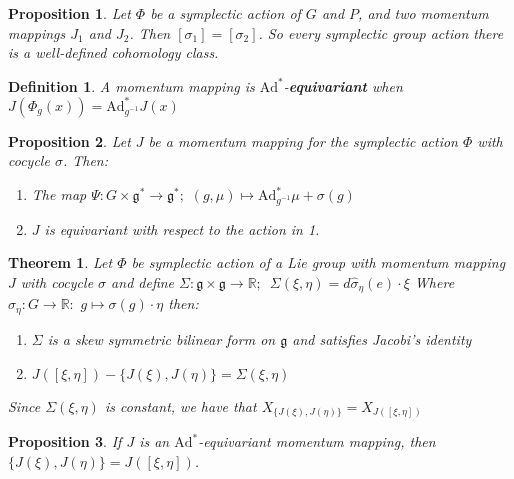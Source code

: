 \documentclass{article}
\newtheorem{thm}{Theorem}
\newtheorem{defn}{Definition}
\newtheorem{prop}{Proposition}
\begin{document}
\begin{prop}

Let $\Phi$ be a symplectic action of $G$ and $P$, and two momentum mappings $J_1$ and $J_2$. Then $[\sigma_1] = [\sigma_2]$. So every symplectic group action there is a well-defined cohomology class.
\end{prop}

\begin{defn}

A momentum mapping is $\mathrm{Ad}^*$-\textbf{equivariant} when $J(\Phi_g(x)) = \mathrm{Ad}^*_{g^{-1}} J(x)$

\end{defn}

\begin{prop}

Let $J$ be a momentum mapping for the symplectic action $\Phi$ with cocycle $\sigma$. Then: 
\begin{enumerate}
    \item The map $\Psi: G \times \mathfrak{g}^* \to \mathfrak{g}^*; \hspace{4pt} (g, \mu) \mapsto \mathrm{Ad}^*_{g^{-1}} \mu + \sigma(g) $
    \item $J$ is equivariant with respect to the action in 1.
\end{enumerate}

\end{prop}

\begin{thm}
Let $\Phi$ be symplectic action of a Lie group with momentum mapping $J$ with cocycle $\sigma$ and define
$\Sigma: \mathfrak{g} \times \mathfrak{g} \to \mathbb{R}; \hspace{6pt} \Sigma(\xi, \eta) = d\widehat{\sigma}_{\eta} (e) \cdot \xi$
Where $\widehat{\sigma}_{\eta} : G \to \mathbb{R}: \hspace{4pt} g \mapsto \sigma(g) \cdot \eta$ then:

\begin{enumerate}
    \item $\Sigma$ is a skew symmetric bilinear form on $\mathfrak{g}$ and satisfies Jacobi's identity
    \item $J([\xi, \eta]) - \{ J(\xi), J(\eta) \} = \Sigma(\xi, \eta)$
\end{enumerate}

Since $\Sigma(\xi, \eta)$ is constant, we have that $X_{ \{ J(\xi), J(\eta) \} } = X_{ J([\xi, \eta]) }$
\end{thm}

\begin{prop}

If $J$ is an $\mathrm{Ad}^*$-equivariant momentum mapping, then $\{ J(\xi), J(\eta) \} = J([\xi, \eta])$. 

\end{prop}
\end{document}
